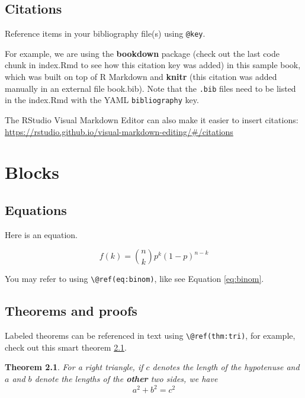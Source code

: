 \documentclass[
]{book}
\newtheorem{theorem}{Theorem}[chapter]
\theoremstyle{definition}
\theoremstyle{definition}
\theoremstyle{definition}
\theoremstyle{definition}
\theoremstyle{remark}
\begin{document}
\section{Citations}\label{citations}

Reference items in your bibliography file(s) using \texttt{@key}.

For example, we are using the \textbf{bookdown} package \citep{R-bookdown} (check out the last code chunk in index.Rmd to see how this citation key was added) in this sample book, which was built on top of R Markdown and \textbf{knitr} \citep{xie2015} (this citation was added manually in an external file book.bib).
Note that the \texttt{.bib} files need to be listed in the index.Rmd with the YAML \texttt{bibliography} key.

The RStudio Visual Markdown Editor can also make it easier to insert citations: \url{https://rstudio.github.io/visual-markdown-editing/\#/citations}

\chapter{Blocks}\label{blocks}

\section{Equations}\label{equations}

Here is an equation.

\begin{equation} 
  f\left(k\right) = \binom{n}{k} p^k\left(1-p\right)^{n-k}
  \label{eq:binom}
\end{equation}

You may refer to using \texttt{\textbackslash{}@ref(eq:binom)}, like see Equation \eqref{eq:binom}.

\section{Theorems and proofs}\label{theorems-and-proofs}

Labeled theorems can be referenced in text using \texttt{\textbackslash{}@ref(thm:tri)}, for example, check out this smart theorem \ref{thm:tri}.

\begin{theorem}
\protect\hypertarget{thm:tri}{}\label{thm:tri}For a right triangle, if \(c\) denotes the \emph{length} of the hypotenuse
and \(a\) and \(b\) denote the lengths of the \textbf{other} two sides, we have
\[a^2 + b^2 = c^2\]
\end{theorem}
\end{document}

